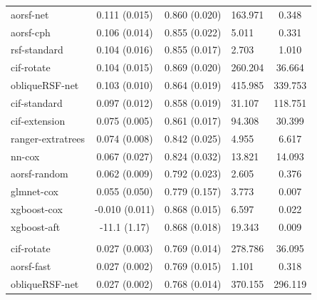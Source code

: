 \documentclass[twoside,11pt]{article}\usepackage[]{graphicx}\usepackage[]{xcolor}
\newenvironment{knitrout}{}{} %
\begin{document}
\begin{knitrout}
\begin{longtable}[t]{lcclc}
\hspace{1em}aorsf-net & 0.111 (0.015) & 0.860 (0.020) & 163.971 & 0.348\\
\hspace{1em}aorsf-cph & 0.106 (0.014) & 0.855 (0.022) & 5.011 & 0.331\\
\hspace{1em}rsf-standard & 0.104 (0.016) & 0.855 (0.017) & 2.703 & 1.010\\
\hspace{1em}cif-rotate & 0.104 (0.015) & 0.869 (0.020) & 260.204 & 36.664\\
\hspace{1em}obliqueRSF-net & 0.103 (0.010) & 0.864 (0.019) & 415.985 & 339.753\\
\hspace{1em}cif-standard & 0.097 (0.012) & 0.858 (0.019) & 31.107 & 118.751\\
\hspace{1em}cif-extension & 0.075 (0.005) & 0.861 (0.017) & 94.308 & 30.399\\
\hspace{1em}ranger-extratrees & 0.074 (0.008) & 0.842 (0.025) & 4.955 & 6.617\\
\hspace{1em}nn-cox & 0.067 (0.027) & 0.824 (0.032) & 13.821 & 14.093\\
\hspace{1em}aorsf-random & 0.062 (0.009) & 0.792 (0.023) & 2.605 & 0.376\\
\hspace{1em}glmnet-cox & 0.055 (0.050) & 0.779 (0.157) & 3.773 & 0.007\\
\hspace{1em}xgboost-cox & -0.010 (0.011) & 0.868 (0.015) & 6.597 & 0.022\\
\hspace{1em}xgboost-aft & -11.1 (1.17) & 0.868 (0.018) & 19.343 & 0.009\\
\addlinespace[0.3em]
\hline
\multicolumn{5}{l}{\textit{\textbf{MESA; stroke, n = 6783, p = 48}}}\\
\hline
\hspace{1em}cif-rotate & 0.027 (0.003) & 0.769 (0.014) & 278.786 & 36.095\\
\hspace{1em}aorsf-fast & 0.027 (0.002) & 0.769 (0.015) & 1.101 & 0.318\\
\hspace{1em}obliqueRSF-net & 0.027 (0.002) & 0.768 (0.014) & 370.155 & 296.119\\

\end{longtable}
\end{knitrout}
\end{document}
